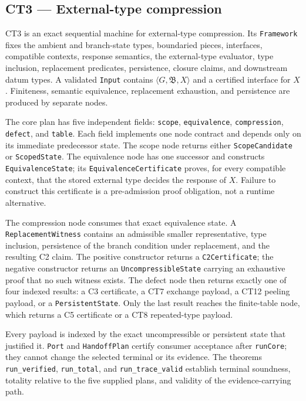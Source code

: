 \subsection{CT3 --- External-type compression}\label{ct:3}\label{boundaried-pieces-and-external-types}

CT3 is an exact sequential machine for external-type compression.  Its
\texttt{Framework} fixes the ambient and branch-state types, boundaried pieces,
interfaces, compatible contexts, response semantics, the external-type
evaluator, type inclusion, replacement predicates, persistence, closure
claims, and downstream datum types.  A validated \texttt{Input} contains
\(\langle G,\mathfrak B,X\rangle\) and a certified interface for \(X\).
Finiteness, semantic equivalence, replacement exhaustion, and persistence are
produced by separate nodes.

The core plan has five independent fields:
\texttt{scope}, \texttt{equivalence}, \texttt{compression}, \texttt{defect},
and \texttt{table}.  Each field implements one node contract and depends only
on its immediate predecessor state.  The scope node returns either
\texttt{ScopeCandidate} or \texttt{ScopedState}.  The equivalence node has one
successor and constructs \texttt{EquivalenceState}; its
\texttt{EquivalenceCertificate} proves, for every compatible context, that the
stored external type decides the response of \(X\).  Failure to construct this
certificate is a pre-admission proof obligation, not a runtime alternative.

The compression node consumes that exact equivalence state.  A
\texttt{ReplacementWitness} contains an admissible smaller representative,
type inclusion, persistence of the branch condition under replacement, and the
resulting C2 claim.  The positive constructor returns a
\texttt{C2Certificate}; the negative constructor returns an
\texttt{UncompressibleState} carrying an exhaustive proof that no such witness
exists.  The defect node then returns exactly one of four indexed results: a C3
certificate, a CT7 exchange payload, a CT12 peeling payload, or a
\texttt{PersistentState}.  Only the last result reaches the finite-table node,
which returns a C5 certificate or a CT8 repeated-type payload.

Every payload is indexed by the exact uncompressible or persistent state that
justified it.  \texttt{Port} and \texttt{HandoffPlan} certify consumer
acceptance after \texttt{runCore}; they cannot change the selected terminal or
its evidence.  The theorems \texttt{run\_verified}, \texttt{run\_total}, and
\texttt{run\_trace\_valid} establish terminal soundness, totality relative to
the five supplied plans, and validity of the evidence-carrying path.

